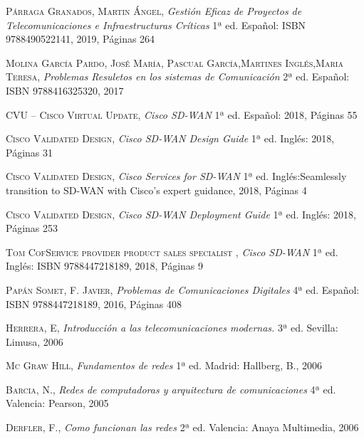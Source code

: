 \begin{thebibliography}{a}

 \textsc{Párraga Granados, Martin Ángel},
\textit{Gestión Eficaz de Proyectos de Telecomunicaciones e Infraestructuras Críticas}
1ª ed. Español: ISBN 9788490522141, 2019, Páginas 264

 \textsc{Molina García Pardo, José María, Pascual García,Martines Inglés,Maria Teresa},
\textit{Problemas Resuletos en los sistemas de Comunicación}
2ª ed. Español: ISBN 9788416325320, 2017 

 \textsc{CVU – Cisco Virtual Update},
\textit{Cisco SD-WAN}
1ª ed. Español: 2018, Páginas 55

 \textsc{Cisco Validated Design},
\textit{Cisco SD-WAN Design Guide}
1ª ed. Inglés:  2018, Páginas 31

 \textsc{Cisco Validated Design},
\textit{Cisco Services for SD-WAN}
1ª ed. Inglés:Seamlessly transition to SD-WAN with Cisco's expert guidance,  2018, Páginas 4

 \textsc{Cisco Validated Design},
\textit{Cisco SD-WAN Deployment Guide}
1ª ed. Inglés: 2018, Páginas 253

 \textsc{Tom CofService provider product sales specialist },
\textit{Cisco SD-WAN}
1ª ed. Inglés: ISBN 9788447218189, 2018, Páginas 9


 \textsc{Papán Somet, F. Javier},
\textit{Problemas de Comunicaciones Digitales}
4ª ed. Español: ISBN 9788447218189, 2016, Páginas 408

 \textsc{Herrera, E},
\textit{Introducción a las telecomunicaciones modernas.}
3ª ed. Sevilla: Limusa, 2006  

 \textsc{Mc Graw Hill},
\textit{Fundamentos de redes}
1ª ed. Madrid: Hallberg, B., 2006

 \textsc{Barcia, N.},
\textit{Redes de computadoras y arquitectura de comunicaciones}
4ª ed. Valencia: Pearson, 2005 

 \textsc{Derfler, F.},
\textit{Como funcionan las redes}
2ª ed. Valencia: Anaya Multimedia, 2006 



\end{thebibliography}


